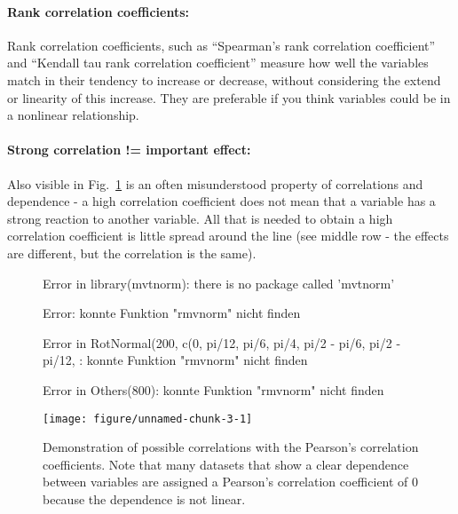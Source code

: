 \documentclass[a4paper,twoside]{tufte-book}\usepackage[]{graphicx}\usepackage[]{color}
\makeatletter
\def\maxwidth{ %
  \ifdim\Gin@nat@width>\linewidth
    \linewidth
  \else
    \Gin@nat@width
  \fi
}
\makeatother
\begin{document}
\paragraph{Rank correlation coefficients:} Rank correlation coefficients, such as ``Spearman's rank correlation coefficient'' and ``Kendall tau rank correlation coefficient'' measure how well the variables match in their tendency to increase or decrease, without considering the extend or linearity of this increase. They are preferable if you think variables could be in a nonlinear relationship.

\paragraph{Strong correlation != important effect:} Also visible in Fig.~\ref{fig: correlation} is an often misunderstood property of correlations and dependence - a high correlation coefficient does not mean that a variable has a strong reaction to another variable. All that is needed to obtain a high correlation coefficient is little spread around the line (see middle row - the effects are different, but the correlation is the same). 


\begin{figure}[htbp]
\begin{center}
\begin{Schunk}
\begin{Soutput}
Error in library(mvtnorm): there is no package called 'mvtnorm'
\end{Soutput}
\begin{Soutput}
Error: konnte Funktion "rmvnorm" nicht finden
\end{Soutput}
\begin{Soutput}
Error in RotNormal(200, c(0, pi/12, pi/6, pi/4, pi/2 - pi/6, pi/2 - pi/12, : konnte Funktion "rmvnorm" nicht finden
\end{Soutput}
\begin{Soutput}
Error in Others(800): konnte Funktion "rmvnorm" nicht finden
\end{Soutput}

\texttt{[image: figure/unnamed-chunk-3-1]} \end{Schunk}
\caption{Demonstration of possible correlations with the Pearson's correlation coefficients. Note that many datasets that show a clear dependence between variables are assigned a Pearson's correlation coefficient of 0 because the dependence is not linear.}
\label{fig: correlation}
\end{center}
\end{figure}
\end{document}

